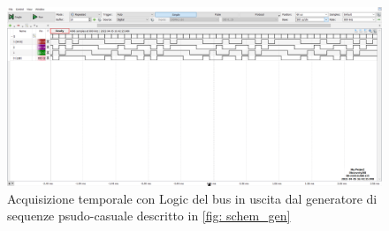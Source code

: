 \documentclass[10pt, a4paper, italian]{article}
\begin{document}
\begin{figure}
	\includegraphics[width=\textwidth]{4.b}
	\caption{\label{fig: TAP_23}Acquisizione temporale con Logic del bus in uscita dal generatore di sequenze psudo-casuale descritto in \cref{fig: schem_gen}}
\end{figure}
\end{document}
